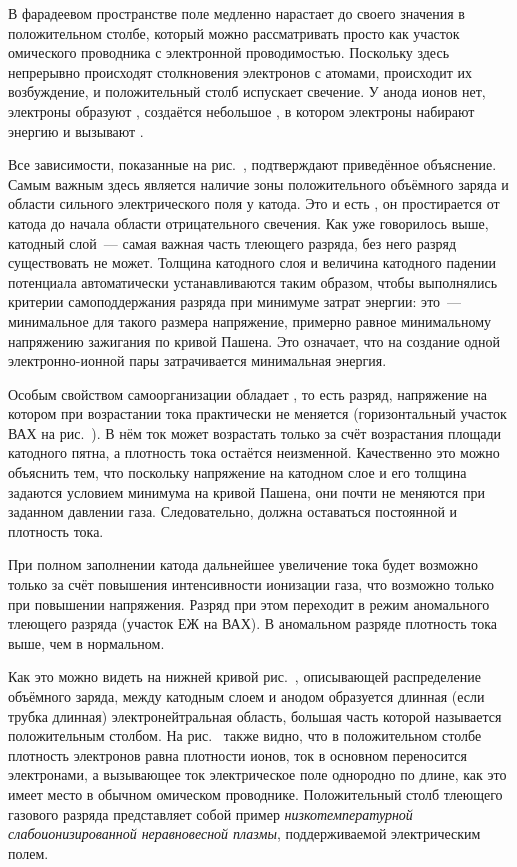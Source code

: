 В фарадеевом пространстве поле медленно нарастает до своего значения в
положительном столбе, который можно рассматривать
просто как участок омического проводника с электронной проводимостью. Поскольку
здесь непрерывно происходят столкновения
электронов с атомами, происходит их возбуждение, и положительный столб испускает
свечение. У анода ионов нет, электроны
образуют , создаётся небольшое
, в котором электроны
набирают энергию и вызывают .

Все зависимости, показанные на рис.~, подтверждают
приведённое объяснение. Самым важным здесь является наличие зоны
положительного объёмного заряда и области сильного электрического поля у катода.
Это и есть , он
простирается от катода до начала области отрицательного свечения. Как уже
говорилось выше, катодный слой~--- самая
важная часть тлеющего разряда, без него разряд существовать не может. Толщина
катодного слоя и величина катодного падении
потенциала автоматически устанавливаются таким образом, чтобы выполнялись
критерии самоподдержания разряда при минимуме
затрат энергии: это~--- минимальное для такого размера напряжение, примерно
равное минимальному напряжению зажигания по
кривой Пашена. Это означает, что на создание одной электронно-ионной пары
затрачивается минимальная энергия.

Особым свойством самоорганизации обладает ,
то есть разряд, напряжение на котором при
возрастании тока практически не меняется (горизонтальный участок ВАХ на
рис.~). В нём ток может возрастать только
за счёт возрастания площади катодного пятна, а плотность тока остаётся
неизменной. Качественно это можно объяснить тем,
что поскольку напряжение на катодном слое и его толщина задаются условием
минимума на кривой Пашена, они почти не
меняются при заданном давлении газа. Следовательно, должна оставаться постоянной
и плотность тока.

При полном заполнении катода дальнейшее увеличение тока будет возможно только за
счёт повышения интенсивности ионизации
газа, что возможно только при повышении напряжения. Разряд при этом переходит в
режим аномального тлеющего разряда
(участок ЕЖ на ВАХ). В аномальном разряде плотность тока выше, чем в нормальном.

Как это можно видеть на нижней кривой рис.~, описывающей
распределение объёмного заряда, между катодным слоем и анодом
образуется длинная (если трубка длинная) электронейтральная область, большая
часть которой называется положительным
столбом. На рис.~ также видно, что в положительном столбе
плотность электронов равна плотности ионов, ток в основном
переносится электронами, а вызывающее ток электрическое поле однородно по длине,
как это имеет место в обычном омическом проводнике.
Положительный столб тлеющего газового разряда представляет собой пример
\emph{низкотемпературной слабоионизированной неравновесной плазмы},
поддерживаемой электрическим полем.

